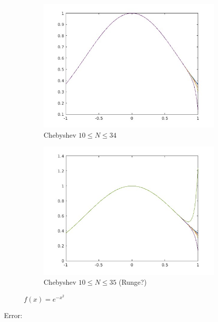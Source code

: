 \documentclass{article}
\begin{document}
\begin{figure}[H]
\begin{subfigure}[b]{0.4\linewidth}
	\includegraphics[width=\linewidth]{f2_cheb.jpg}
        \caption{Chebyshev $10 \le N \le 34$}
    \end{subfigure}
    \begin{subfigure}[b]{0.4\linewidth}
	\includegraphics[width=\linewidth]{f2_cheb_1.jpg}
        \caption{Chebyshev $10 \le N \le 35$ (Runge?)}
    \end{subfigure}
    \caption{$f(x) = e^{-x^2}$}
\end{figure}

Error:
\end{document}
